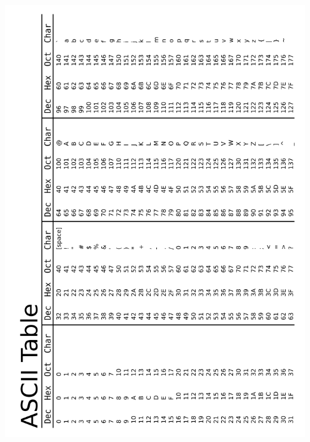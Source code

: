 \documentclass[12pt]{article}
\begin{document}
\includegraphics[height=\textheight]{wikimedia-ascii-table.png}
\end{document}
